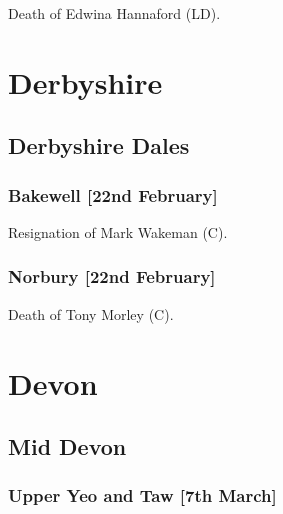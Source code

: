 \documentclass[a4paper,openany]{book}
\begin{document}
\begin{resultsiii}

Death of Edwina Hannaford (LD).

\section{Derbyshire}

\subsection*{Derbyshire Dales}

\subsubsection*{Bakewell \hspace*{\fill}\nolinebreak[1]%
	\enspace\hspace*{\fill}
	[22nd February]}


Resignation of Mark Wakeman (C).

\subsubsection*{Norbury \hspace*{\fill}\nolinebreak[1]%
	\enspace\hspace*{\fill}
	[22nd February]}


Death of Tony Morley (C).

\section{Devon}

\subsection*{Mid Devon}

\subsubsection*{Upper Yeo and Taw \hspace*{\fill}\nolinebreak[1]%
	\enspace\hspace*{\fill}
	[7th March]}


\end{resultsiii}
\end{document}
